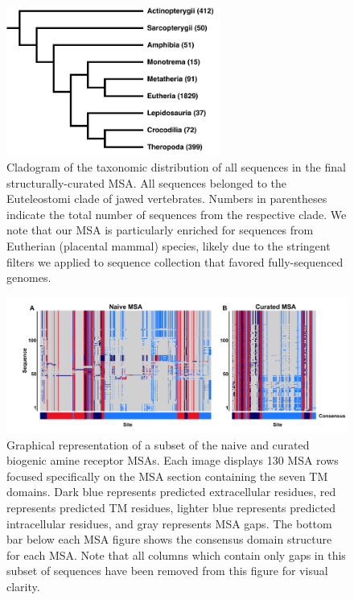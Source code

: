 \documentclass[fleqn,10pt]{wlpeerj}
\begin{document}
\begin{figure}[htbp]
	\centerline{\includegraphics[width=7cm]{figures/taxonomic_distribution.pdf}}
	\caption{\label{taxa_dist} Cladogram of the taxonomic distribution of all sequences in the final structurally-curated MSA. All sequences belonged to the Euteleostomi clade of jawed vertebrates. Numbers in parentheses indicate the total number of sequences from the respective clade. We note that our MSA is particularly enriched for sequences from Eutherian (placental mammal) species, likely due to the stringent filters we applied to sequence collection that favored fully-sequenced genomes.}
\end{figure}

\vspace*{4cm}


\begin{figure}[htbp]
	\centerline{\includegraphics[width=7in]{figures/domains_struc_naive.png}}
	\caption{\label{domains} Graphical representation of a subset of the naive and curated biogenic amine receptor MSAs. Each image displays 130 MSA rows focused specifically on the MSA section containing the seven TM domains. Dark blue represents predicted extracellular residues, red represents predicted TM residues, lighter blue represents predicted intracellular residues, and gray represents MSA gaps. The bottom bar below each MSA figure shows the consensus domain structure for each MSA. Note that all columns which contain only gaps in this subset of sequences have been removed from this figure for visual clarity.}
\end{figure}
\end{document}
